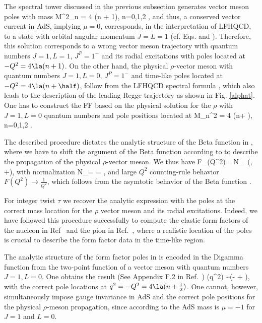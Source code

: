 \documentclass[aps,prd,preprint,groupedaddress]{revtex4-1}
\begin{document}
The spectral tower discussed in the previous subsection generates vector meson poles with mass
\beq
M^2_{n} = 4 \la(n + 1),  \hspace{20pt} n=0,1,2 \cdots , 
\enq
and thus,  a conserved vector current in AdS, implying $\mu=0$, corresponds, in the interpretation of LFHQCD, to a state with orbital angular momentum $J=L=1$ (cf. Eqs.  and ). Therefore, this solution  corresponds  to a wrong  vector meson trajectory with quantum numbers $J=1, L=1$, $J^P = 1^+$ and its radial excitations with  poles located at $- Q^2 = 4 \la (n + 1)$. On the other hand,  the physical $\rho$-vector meson with quantum numbers $J=1, L=0$, $J^P = 1^-$ and  time-like poles  located at  $- Q^2 = 4 \la (n+ \half)$, follow from the LFHQCD spectral formula , which also leads to the description of the leading Regge trajectory as shown in Fig. \ref{alphat}. One has to construct the FF based on the physical solution for the $\rho$ with $J=1, L=0$  quantum numbers and pole positions located at
\beq {}
M_n^2 = 4 \la \left(n+ \half \right),  \hspace{20pt} n=0,1,2 \cdots.
\enq 


The described  procedure dictates the analytic structure of the Beta function in , where we have to shift the argument of the Beta function according to  to describe the propagation of the physical $\rho$-vector meson. We thus have
\beq {}
F_\ta(Q^2)= N_\tau\, \Be\left(,  +\half \right),
\enq
with normalization
\beq
N_\ta =  =  ,
\enq
and large $Q^2$ counting-rule behavior $F(Q^2) \to \frac{1}{Q^2}$, which follows from the asymtotic behavior of the Beta function .

For integer twist $\tau$ we recover the analytic expression  with the poles at the correct mass location for the $\rho$ vector meson and its radial excitations.  Indeed, we have followed this procedure successfully to compute the elastic form factors of the nucleon in Ref~\cite{Sufian:2016hwn} and  the pion  in Ref.~\cite{Brodsky:2014yha}, where a realistic  location of the poles is crucial to describe the form factor data in the time-like region.

The analytic structure of the form factor poles in  is encoded in the Digamma function from the two-point function  of a vector meson with quantum numbers $J = 1, L= 0$.  One obtains the result (See Appendix F.2 in Ref.~\cite{Brodsky:2014yha})
\beq \label{Sirho}
\Si(q^2) \sim \psi\left(-  + \right),
\enq
with the correct pole locations at $q^2 = - Q^2 = 4 \la (n + \frac{1}{2})$.  One cannot, however,  simultaneously impose gauge invariance in AdS and the correct pole positions for the physical $\rho$-meson propagation, since according to  the AdS mass is $\mu = - 1 $ for $J=1$ and $L=0$.
\end{document}
